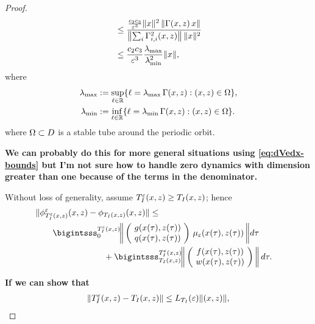 \documentclass[twocolumn]{article}
\begin{document}
\begin{proof}
\begin{align}
    \nonumber
    &\leq \frac{\frac{c_{2}c_{3}}{\varepsilon^{3}} \|x\|^{2} \left\| \Gamma(x, z)
      \, x \right\|}{\left\|
      \sum_{i} \Gamma_{i,i}^{2}(x, z) \right\| \|x\|^{2}}\\
    &\leq \frac{c_{2}c_{3}}{\varepsilon^{3}} \frac{\lambda_{\max}}{\lambda_{\min}^{2}} \|x\|,
  \end{align}
  where
  \begin{align}
    \lambda_{\max} &:= \sup_{\ell \in \mathbb{R}} \{ \ell = \operatorname*{\lambda_{\mathrm{max}}}\Gamma(x, z) : (x, z) \in \Omega \},\\
    \lambda_{\min} &:= \inf_{\ell \in \mathbb{R}} \{ \ell = \operatorname*{\lambda_{\mathrm{min}}}\Gamma(x, z) : (x, z) \in \Omega \}.
  \end{align}
  where $\Omega \subset D$ is a stable tube around the periodic orbit.
  
  
  {\bf We can probably do this for more general situations using \eqref{eq:dVedx-bounds} but I'm not sure how to handle zero dynamics with dimension greater than one because of the terms in the denominator.}

  Without loss of generality, assume $T_{I}^{\varepsilon}(x, z) \geq T_{I}(x, z)$; hence
  \begin{align}
    \lefteqn{\| \floweps_{\TIe(\zdx,\zdz)}\argsxz - \flow_{\TI(\zdx,\zdz)}\argsxz \| \leq}\\
    \nonumber
    & \hspace{2em} \bigintsss_{0}^{\TIe\argsxz} \! \bigg\| \left(\!\begin{array}{c} g\argstxz\\ q\argstxz \end{array}\!\right) \, \mueps\argstxz \, \bigg\| d\tau\\
    \nonumber
    & \hspace{8em} \mbox{} + \bigintsss_{\TI\argsxz}^{\TIe\argsxz} \! \bigg\| \left(\!\begin{array}{c} f\argstxz\\ w\argstxz \end{array}\!\right) \bigg\| \, d\tau.
  \end{align}

  {\bf If we can show that}
  \begin{align*}
    \| T_{I}^{\varepsilon}(x, z) - T_{I}(x, z) \| \leq L_{T_{I}}(\varepsilon) \|(x, z)\|,
  \end{align*}

\end{proof}
\end{document}
